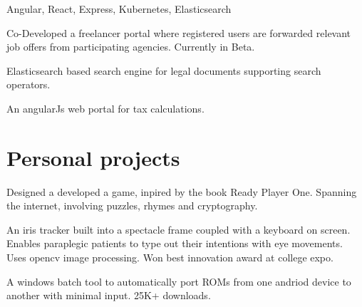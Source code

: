 \documentclass[]{font}
\begin{document}
\begin{minipage}[t]{0.66\textwidth}
Angular, React, Express, Kubernetes, Elasticsearch
\begin{tightemize}
\item Co-Developed a freelancer portal where registered users are forwarded relevant job offers from participating agencies. Currently in Beta.
\item Elasticsearch based search engine for legal documents supporting search operators.
\item An angularJs web portal for tax calculations.
\end{tightemize}    


\sectionsep



\section{Personal projects}

Designed a developed a game, inpired by the book Ready Player One. Spanning the internet, involving puzzles, rhymes and cryptography.
\sectionsep

An iris tracker built into a spectacle frame coupled with a keyboard on screen. Enables paraplegic patients to type out their intentions with eye movements. Uses opencv image processing. Won best innovation award at college expo.
\sectionsep

A windows batch tool to automatically port ROMs from one andriod device to another with minimal input. 25K+ downloads.
\sectionsep

\end{minipage} 
\end{document}
